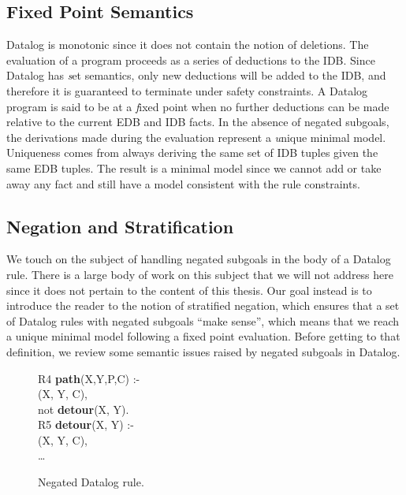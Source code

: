 \subsection{Fixed Point Semantics}

Datalog is monotonic since it does not contain the notion of deletions.  The
evaluation of a program proceeds as a series of deductions to the IDB.  Since
Datalog has {\emph set semantics}, only new deductions will be added to the
IDB, and therefore it is guaranteed to terminate under safety constraints.  A
Datalog program is said to be at a {\emph fixed point} when no further
deductions can be made relative to the current EDB and IDB facts.  In the
absence of negated subgoals, the derivations made during the evaluation
represent a {\emph unique minimal model}.  Uniqueness comes from always
deriving the same set of IDB tuples given the same EDB tuples.  The result is a
minimal model since we cannot add or take away any fact and still have a model
consistent with the rule constraints.

\subsection{Negation and Stratification}

We touch on the subject of handling negated subgoals in the body of a Datalog
rule.  There is a large body of work on this subject that we will not address
here since it does not pertain to the content of this thesis.  Our goal instead
is to introduce the reader to the notion of stratified negation, which ensures
that a set of Datalog rules with negated subgoals ``make sense'', which means
that we reach a unique minimal model following a fixed point evaluation.
Before getting to that definition, we review some semantic issues raised by
negated subgoals in Datalog.

\begin{figure}
\centering
\ssp
\begin{boxedminipage}{\linewidth}
R4 {\bf path}(X,Y,P,C) :- \\
(X, Y, C), \\
\datalogspace not {\bf detour}(X, Y). \\

R5 {\bf detour}(X, Y) :- \\
(X, Y, C), \\
\datalogspace \ldots 
\end{boxedminipage}
\caption{\label{ch:p2:fig:negation}Negated Datalog rule.}
\end{figure}

